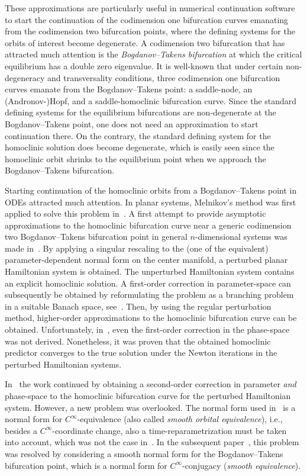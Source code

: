 These approximations are particularly useful in numerical continuation software
to start the continuation of the codimension one bifurcation curves emanating
from the codimension two bifurcation points, where the defining systems for the
orbits of interest become degenerate. A codimension two bifurcation that has
attracted much attention is the \emph{Bogdanov--Takens bifurcation} at which the
cri\-ti\-cal equilibrium has a double zero eigenvalue. It is well-known that
under certain non-degeneracy and transversality conditions, three codimension
one bifurcation curves emanate from the Bogdanov--Takens point: a saddle-node,
an (Andronov-)Hopf, and a saddle-homoclinic bifurcation curve. Since the
standard defining systems for the equilibrium bifurcations are non-degenerate
at the Bogdanov--Takens point, one does not need an approximation to start
continuation there.  On the contrary, the standard defining system for the
homoclinic solution does become degenerate, which is easily seen since the
homoclinic orbit shrinks to the equilibrium point when we approach the Bogdanov--Takens
bifurcation.

Starting continuation of the homoclinic orbits from a Bogdanov--Takens point in
ODEs attracted much attention. In planar systems, Melnikov's method was first
applied to solve this problem in~\cite{Rodriguez-Luis1990}. A first attempt to
provide asymptotic approximations to the homoclinic bifurcation curve near a
generic codimension two Bogdanov--Takens bifurcation point in general
$n$-dimensional systems was made in~\cite{Beyn_1994}. By applying a singular
rescaling to the (one of the equivalent) parameter-dependent normal form on the
center manifold, a perturbed planar Hamiltonian system is obtained. The
unperturbed Hamiltonian system contains an explicit homoclinic solution. A
first-order correction in parameter-space can subsequently be obtained by
reformulating the problem as a branching problem in a suitable Banach space,
see~\cite{Beyn_1994}.  Then, by using the regular perturbation method,
higher-order approximations to the homoclinic bifurcation curve can be
obtained. Unfortunately, in~\cite{Beyn_1994}, even the first-order correction in
the phase-space was not derived.  Nonetheless, it was proven that the obtained
homoclinic predictor converges to the true solution under the Newton iterations
in the perturbed Hamiltonian systems.

In~\cite{Kuznetsov2014improved} the work continued by obtaining a second-order
correction in parameter \emph{and} phase-space to the homoclinic bifurcation
curve for the perturbed Hamiltonian system. However, a new problem was
overlooked.  The normal form used in~\cite{Kuznetsov2014improved} is a normal
form for $C^\infty$-equivalence (also called \emph{smooth orbital
equivalence}), i.e., besides a $C^\infty$-coordinate change, also a time-reparametrization
must be taken into account, which was not the case
in~\cite{Kuznetsov2014improved}. In the subsequent paper~\cite{Gray-Scott2015},
this problem was resolved by considering a smooth normal form for the
Bogdanov--Takens bifurcation point, which is a normal form for
$C^\infty$-conjugacy (\emph{smooth equivalence}). 

